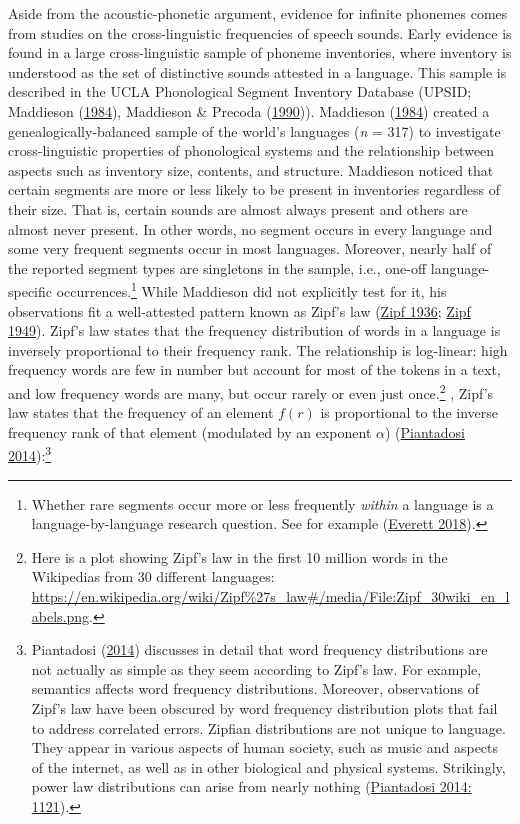 \documentclass[
]{article}
\begin{document}
Aside from the acoustic-phonetic argument, evidence for infinite
phonemes comes from studies on the cross-linguistic frequencies of
speech sounds. Early evidence is found in a large cross-linguistic
sample of phoneme inventories, where inventory is understood as the set
of distinctive sounds attested in a language. This sample is described
in the UCLA Phonological Segment Inventory Database (UPSID; Maddieson
(\protect\hyperlink{ref-Maddieson1984}{1984}), Maddieson \& Precoda
(\protect\hyperlink{ref-MaddiesonPrecoda1990}{1990})). Maddieson
(\protect\hyperlink{ref-Maddieson1984}{1984}) created a
genealogically-balanced sample of the world's languages (\emph{n} = 317)
to investigate cross-linguistic properties of phonological systems and
the relationship between aspects such as inventory size, contents, and
structure. Maddieson noticed that certain segments are more or less
likely to be present in inventories regardless of their size. That is,
certain sounds are almost always present and others are almost never
present. In other words, no segment occurs in every language and some
very frequent segments occur in most languages. Moreover, nearly half of
the reported segment types are singletons in the sample, i.e., one-off
language-specific occurrences.\footnote{Whether rare segments occur more
  or less frequently \emph{within} a language is a language-by-language
  research question. See for example
  (\protect\hyperlink{ref-Everett2018}{Everett 2018}).} While Maddieson
did not explicitly test for it, his observations fit a well-attested
pattern known as Zipf's law (\protect\hyperlink{ref-Zipf1936}{Zipf
1936}; \protect\hyperlink{ref-Zipf1949}{Zipf 1949}). Zipf's law states
that the frequency distribution of words in a language is inversely
proportional to their frequency rank. The relationship is log-linear:
high frequency words are few in number but account for most of the
tokens in a text, and low frequency words are many, but occur rarely or
even just once.\footnote{Here is a plot showing Zipf's law in the first
  10 million words in the Wikipedias from 30 different languages:
  \url{https://en.wikipedia.org/wiki/Zipf\%27s_law\#/media/File:Zipf_30wiki_en_labels.png}.}
, Zipf's law states that the frequency of an element \(f(r)\) is
proportional to the inverse frequency rank of that element (modulated by
an exponent \(\alpha\))
(\protect\hyperlink{ref-Piantadosi2014}{Piantadosi 2014}):\footnote{Piantadosi
  (\protect\hyperlink{ref-Piantadosi2014}{2014}) discusses in detail
  that word frequency distributions are not actually as simple as they
  seem according to Zipf's law. For example, semantics affects word
  frequency distributions. Moreover, observations of Zipf's law have
  been obscured by word frequency distribution plots that fail to
  address correlated errors. Zipfian distributions are not unique to
  language. They appear in various aspects of human society, such as
  music and aspects of the internet, as well as in other biological and
  physical systems. Strikingly, power law distributions can arise from
  nearly nothing (\protect\hyperlink{ref-Piantadosi2014}{Piantadosi
  2014: 1121}).}
\end{document}
